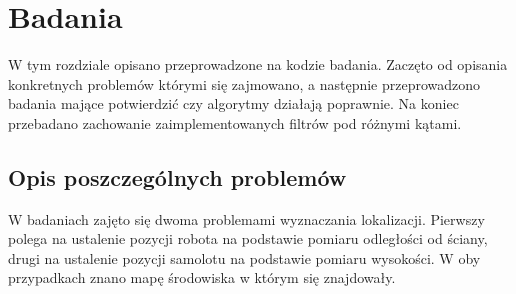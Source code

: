 \chapter{Badania} \label{przeg}
W tym rozdziale opisano przeprowadzone na kodzie badania. Zaczęto od opisania konkretnych problemów którymi się zajmowano, a następnie przeprowadzono badania mające potwierdzić czy algorytmy działają poprawnie. Na koniec przebadano zachowanie zaimplementowanych filtrów pod różnymi kątami.
\section{Opis poszczególnych problemów}
W badaniach zajęto się dwoma problemami wyznaczania lokalizacji. Pierwszy polega na ustalenie pozycji robota na podstawie pomiaru odległości od ściany, drugi na ustalenie pozycji samolotu na podstawie pomiaru wysokości. W oby przypadkach znano mapę środowiska w którym się znajdowały.
